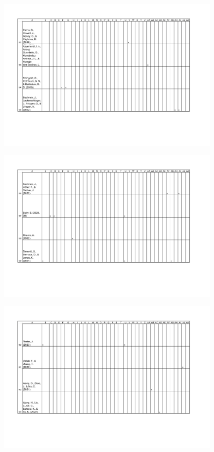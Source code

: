 \begin{figure}[H]
	\centering
		\includegraphics[width=1.0\textwidth]{Pictures/concept_matrix/wos-14.png}
\end{figure}

\begin{figure}[H]
	\centering
		\includegraphics[width=1.0\textwidth]{Pictures/concept_matrix/wos-15.png}
\end{figure}

\begin{figure}[H]
	\centering
		\includegraphics[width=1.0\textwidth]{Pictures/concept_matrix/wos-16.png}
\end{figure}

